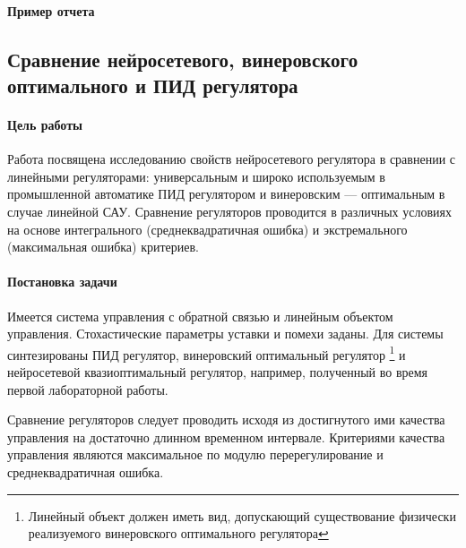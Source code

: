 \paragraph{Пример отчета}


\subsection{Сравнение нейросетевого, винеровского оптимального и ПИД регулятора}

\paragraph{Цель работы}

Работа посвящена исследованию свойств нейросетевого регулятора в
сравнении с линейными регуляторами: универсальным и широко
используемым в промышленной автоматике ПИД регулятором и винеровским
--- оптимальным в случае линейной САУ.  Сравнение регуляторов
проводится в различных условиях на основе интегрального
(среднеквадратичная ошибка) и экстремального (максимальная ошибка)
критериев.

\paragraph{Постановка задачи}

Имеется система управления с обратной связью и линейным объектом
управления.  Стохастические параметры уставки и помехи заданы.  Для
системы синтезированы ПИД регулятор, винеровский оптимальный регулятор
\footnote{Линейный объект должен иметь вид, допускающий существование
  физически реализуемого винеровского оптимального регулятора} и
нейросетевой квазиоптимальный регулятор, например, полученный во время
первой лабораторной работы.

Сравнение регуляторов следует проводить исходя из достигнутого ими
качества управления на достаточно длинном временном интервале.
Критериями качества управления являются максимальное по модулю
перерегулирование и среднеквадратичная ошибка.

